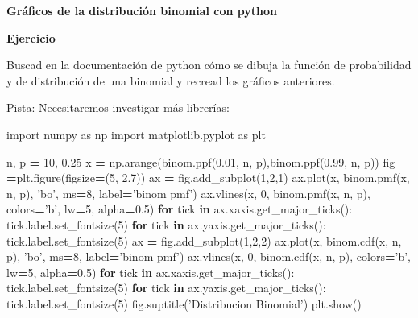 \documentclass[]{book}
\newenvironment{Shaded}{\begin{snugshade}}{\end{snugshade}}
\newcommand{\ControlFlowTok}[1]{\textcolor[rgb]{0.13,0.29,0.53}{\textbf{#1}}}
\newcommand{\DecValTok}[1]{\textcolor[rgb]{0.00,0.00,0.81}{#1}}
\newcommand{\FloatTok}[1]{\textcolor[rgb]{0.00,0.00,0.81}{#1}}
\newcommand{\ImportTok}[1]{#1}
\newcommand{\KeywordTok}[1]{\textcolor[rgb]{0.13,0.29,0.53}{\textbf{#1}}}
\newcommand{\NormalTok}[1]{#1}
\newcommand{\OperatorTok}[1]{\textcolor[rgb]{0.81,0.36,0.00}{\textbf{#1}}}
\newcommand{\StringTok}[1]{\textcolor[rgb]{0.31,0.60,0.02}{#1}}
\begin{document}
\textbf{Gráficos de la distribución binomial con python}

\textbf{Ejercicio}

Buscad en la documentación de python cómo se dibuja la función de probabilidad y de distribución de una binomial y recread los gráficos anteriores.

Pista: Necesitaremos investigar más librerías:

\begin{Shaded}
\begin{Highlighting}[]
\ImportTok{import}\NormalTok{ numpy }\ImportTok{as}\NormalTok{ np}
\ImportTok{import}\NormalTok{ matplotlib.pyplot }\ImportTok{as}\NormalTok{ plt}
\end{Highlighting}
\end{Shaded}

\begin{Shaded}
\begin{Highlighting}[]
\NormalTok{n, p }\OperatorTok{=} \DecValTok{10}\NormalTok{, }\FloatTok{0.25}
\NormalTok{x }\OperatorTok{=}\NormalTok{ np.arange(binom.ppf(}\FloatTok{0.01}\NormalTok{, n, p),binom.ppf(}\FloatTok{0.99}\NormalTok{, n, p))}
\NormalTok{fig }\OperatorTok{=}\NormalTok{plt.figure(figsize}\OperatorTok{=}\NormalTok{(}\DecValTok{5}\NormalTok{, }\FloatTok{2.7}\NormalTok{))}
\NormalTok{ax }\OperatorTok{=}\NormalTok{ fig.add_subplot(}\DecValTok{1}\NormalTok{,}\DecValTok{2}\NormalTok{,}\DecValTok{1}\NormalTok{)}
\NormalTok{ax.plot(x, binom.pmf(x, n, p), }\StringTok{'bo'}\NormalTok{, ms}\OperatorTok{=}\DecValTok{8}\NormalTok{, label}\OperatorTok{=}\StringTok{'binom pmf'}\NormalTok{)}
\NormalTok{ax.vlines(x, }\DecValTok{0}\NormalTok{, binom.pmf(x, n, p), colors}\OperatorTok{=}\StringTok{'b'}\NormalTok{, lw}\OperatorTok{=}\DecValTok{5}\NormalTok{, alpha}\OperatorTok{=}\FloatTok{0.5}\NormalTok{)}
\ControlFlowTok{for}\NormalTok{ tick }\KeywordTok{in}\NormalTok{ ax.xaxis.get_major_ticks():}
\NormalTok{  tick.label.set_fontsize(}\DecValTok{5}\NormalTok{)}
\ControlFlowTok{for}\NormalTok{ tick }\KeywordTok{in}\NormalTok{ ax.yaxis.get_major_ticks():}
\NormalTok{  tick.label.set_fontsize(}\DecValTok{5}\NormalTok{) }
\NormalTok{ax }\OperatorTok{=}\NormalTok{ fig.add_subplot(}\DecValTok{1}\NormalTok{,}\DecValTok{2}\NormalTok{,}\DecValTok{2}\NormalTok{)}
\NormalTok{ax.plot(x, binom.cdf(x, n, p), }\StringTok{'bo'}\NormalTok{, ms}\OperatorTok{=}\DecValTok{8}\NormalTok{, label}\OperatorTok{=}\StringTok{'binom pmf'}\NormalTok{)}
\NormalTok{ax.vlines(x, }\DecValTok{0}\NormalTok{, binom.cdf(x, n, p), colors}\OperatorTok{=}\StringTok{'b'}\NormalTok{, lw}\OperatorTok{=}\DecValTok{5}\NormalTok{, alpha}\OperatorTok{=}\FloatTok{0.5}\NormalTok{)}
\ControlFlowTok{for}\NormalTok{ tick }\KeywordTok{in}\NormalTok{ ax.xaxis.get_major_ticks():}
\NormalTok{  tick.label.set_fontsize(}\DecValTok{5}\NormalTok{)}
\ControlFlowTok{for}\NormalTok{ tick }\KeywordTok{in}\NormalTok{ ax.yaxis.get_major_ticks():}
\NormalTok{  tick.label.set_fontsize(}\DecValTok{5}\NormalTok{)}
\NormalTok{fig.suptitle(}\StringTok{'Distribucion Binomial'}\NormalTok{)}
\NormalTok{plt.show()}
\end{Highlighting}
\end{Shaded}
\end{document}
